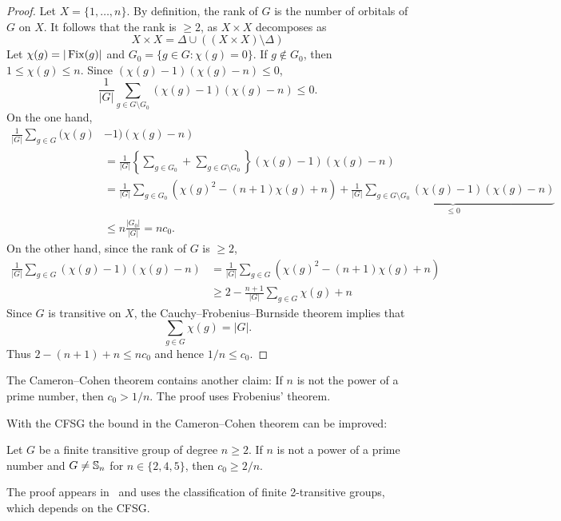 \begin{proof}
    Let $X=\{1,\dots,n\}$. By definition, the rank of $G$ is the number
    of orbitals of $G$ on $X$. It follows that the rank is $\geq2$, as
    $X\times X$ decomposes as 
    \[
    X\times X=\Delta\cup\left((X\times X)\setminus\Delta\right)
    \]
    Let $\chi(g)=|\operatorname{Fix}(g)|$ and $G_0=\{g\in G:\chi(g)=0\}$. If $g\not\in G_0$, then $1\leq\chi(g)\leq n$. Since  
    $(\chi(g)-1)(\chi(g)-n)\leq 0$,
    \[
    \frac{1}{|G|}\sum_{g\in G\setminus G_0}(\chi(g)-1)(\chi(g)-n)\leq 0.
    \]
    On the one hand, 
    \begin{align*}
    \frac{1}{|G|}\sum_{g\in G}(\chi(g)&-1)(\chi(g)-n)\\
    &=\frac{1}{|G|}\left\{\sum_{g\in G_0}+\sum_{g\in G\setminus G_0}\right\}(\chi(g)-1)(\chi(g)-n)\\
    &=\frac{1}{|G|}\sum_{g\in G_0}(\chi(g)^2-(n+1)\chi(g)+n)
    +\underbrace{\frac{1}{|G|}\sum_{g\in G\setminus G_0}(\chi(g)-1)(\chi(g)-n)}_{\leq0}\\
    &\leq n\frac{|G_0|}{|G|}=nc_0.
    \end{align*}
    On the other hand, since the rank of $G$ is $\geq2$, 
    \begin{align*}
        \frac{1}{|G|}\sum_{g\in G}(\chi(g)-1)(\chi(g)-n)
        &=\frac{1}{|G|}\sum_{g\in G}(\chi(g)^2-(n+1)\chi(g)+n)\\
        &\geq 2-\frac{n+1}{|G|}\sum_{g\in G}\chi(g)+n
    \end{align*}
    Since $G$ is transitive on $X$, the Cauchy--Frobenius--Burnside theorem implies that
    \[
    \sum_{g\in G}\chi(g)=|G|.
    \]
    Thus $2-(n+1)+n\leq nc_0$ and hence
    $1/n\leq c_0$. 
\end{proof}

The Cameron--Cohen theorem contains another claim: If
$n$ is not the power of a prime number, then 
$c_0>1/n$. The proof uses Frobenius' theorem. 

With the CFSG the bound in the 
Cameron--Cohen theorem can be improved:

\begin{theorem}
    Let $G$ be a finite transitive group of degree $n\geq2$. If $n$ 
    is not a power of a prime number and 
    $G\ne\mathbb{S}_n$ for $n\in\{2,4,5\}$, then $c_0\geq 2/n$.
\end{theorem}

The proof appears in~\cite{MR1484879} and uses
the classification of finite 2-transitive groups, 
which depends on the CFSG. 




